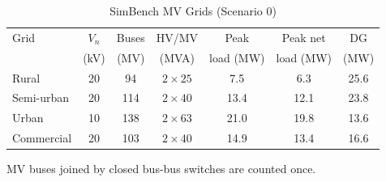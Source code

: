 \begin{table}[t]
\centering
\caption{SimBench MV Grids (Scenario 0)}
\label{tab:grids}
\setlength{\tabcolsep}{2.8pt}
\begin{tabular}{lcccccc}
\toprule
Grid & $V_n$ & Buses & HV/MV & Peak & Peak net & DG \\
 & (kV) & (MV) & (MVA) & load (MW) & load (MW) & (MW) \\
\midrule
Rural & 20 & 94 & $2\times25$ & 7.5 & 6.3 & 25.6 \\
Semi-urban & 20 & 114 & $2\times40$ & 13.4 & 12.1 & 23.8 \\
Urban & 10 & 138 & $2\times63$ & 21.0 & 19.8 & 13.6 \\
Commercial & 20 & 103 & $2\times40$ & 14.9 & 13.4 & 16.6 \\
\bottomrule
\end{tabular}
\vspace{2pt}
\begin{minipage}{\columnwidth}\footnotesize MV buses joined by closed bus-bus switches are counted once.\end{minipage}
\end{table}
